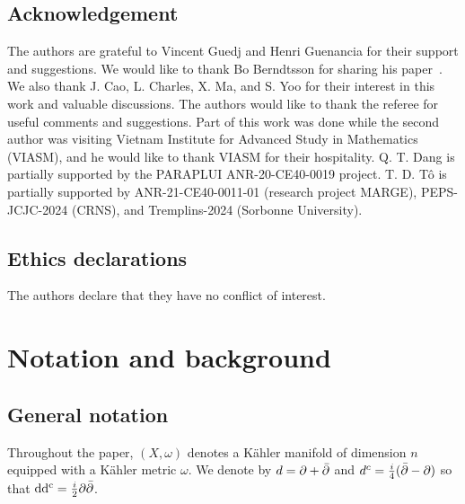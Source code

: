 \documentclass[a4paper, 11pt]{amsart}
\theoremstyle{plain}
\numberwithin{equation}{section} %
\numberwithin{figure}{section} %
\theoremstyle{plain}
\theoremstyle{plain}
\theoremstyle{plain}
\theoremstyle{plain}
\theoremstyle{remark}
\theoremstyle{definition}
\theoremstyle{definition}
\DeclareMathOperator \ddc{\textrm{dd}^c}
\begin{document}
\subsection*{Acknowledgement} The authors are grateful to Vincent Guedj and Henri Guenancia for their support and suggestions. We would like to thank Bo Berndtsson for sharing his paper~\cite{berndtsson09-remarks-tsuji'}. We also thank J. Cao, L. Charles, X. Ma, and S. Yoo for their interest in this work and valuable discussions.  The authors would like to thank the referee for useful comments
and suggestions. Part of this work was done while the second author was visiting Vietnam Institute for Advanced Study in Mathematics (VIASM), and he would like to thank VIASM for their hospitality. 
Q. T. Dang is partially supported by the PARAPLUI ANR-20-CE40-0019 project.
T. D. T\^o is partially supported by ANR-21-CE40-0011-01 (research project MARGE), PEPS-JCJC-2024 (CRNS), and Tremplins-2024 (Sorbonne University).

\subsection*{Ethics declarations} The authors declare that they have no conflict of interest.

\section{Notation and background}\label{sect: background}
\subsection{General notation} Throughout the paper,
 $(X,\omega)$ denotes a K\"ahler manifold of dimension $n$ equipped with a K\"ahler metric $\omega$.  We denote by $d=\partial+\Bar{\partial}$ and ${d^c}=\frac{i}{4}(\Bar{\partial}-\partial)$ so that $\ddc=\frac{i}{2}\partial\Bar{\partial}$.
 
\end{document}
